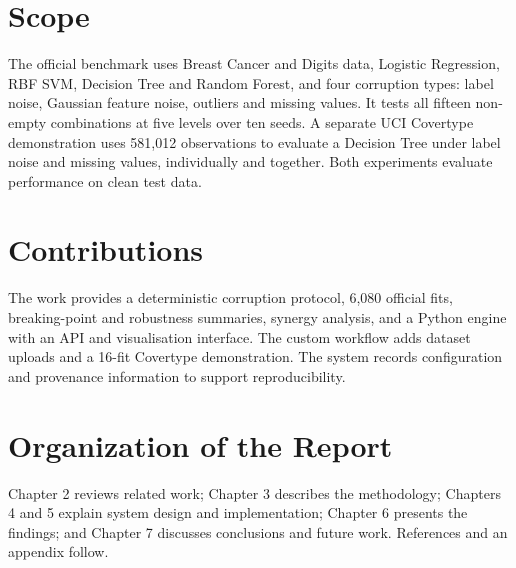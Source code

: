 \section{Scope}
The official benchmark uses Breast Cancer and Digits data, Logistic Regression, RBF SVM, Decision Tree and Random Forest, and four corruption types: label noise, Gaussian feature noise, outliers and missing values. It tests all fifteen non-empty combinations at five levels over ten seeds. A separate UCI Covertype demonstration uses 581,012 observations to evaluate a Decision Tree under label noise and missing values, individually and together. Both experiments evaluate performance on clean test data.
\section{Contributions}
The work provides a deterministic corruption protocol, 6,080 official fits, breaking-point and robustness summaries, synergy analysis, and a Python engine with an API and visualisation interface. The custom workflow adds dataset uploads and a 16-fit Covertype demonstration. The system records configuration and provenance information to support reproducibility.
\section{Organization of the Report}
Chapter 2 reviews related work; Chapter 3 describes the methodology; Chapters 4 and 5 explain system design and implementation; Chapter 6 presents the findings; and Chapter 7 discusses conclusions and future work. References and an appendix follow.
